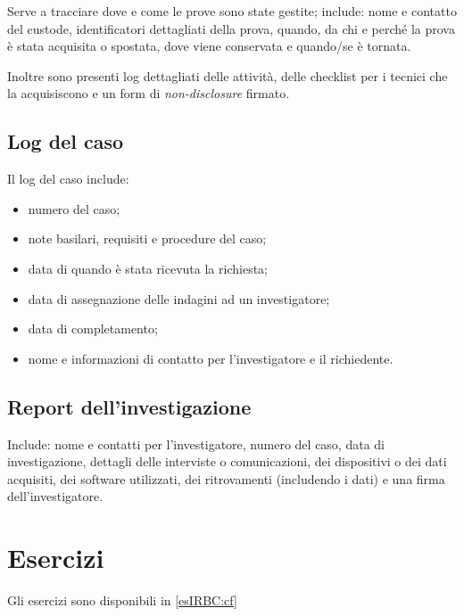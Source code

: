 Serve a tracciare dove e come le prove sono state gestite; include:
nome e contatto del custode, identificatori dettagliati della prova, quando,
da chi e perché la prova è stata acquisita o spostata, dove viene conservata
e quando/se è tornata.

Inoltre sono presenti log dettagliati delle attività, delle checklist per i
tecnici che la acquisiscono e un form di \textit{non-disclosure} firmato.

\subsection{Log del caso}

Il log del caso include:
\begin{itemize}
\item numero del caso;
\item note basilari, requisiti e procedure del caso;
\item data di quando è stata ricevuta la richiesta;
\item data di assegnazione delle indagini ad un investigatore;
\item data di completamento;
\item nome e informazioni di contatto per l'investigatore e il richiedente.
\end{itemize}

\subsection{Report dell'investigazione}

Include: nome e contatti per l'investigatore, numero del caso, data di
investigazione, dettagli delle interviste o comunicazioni, dei
dispositivi o dei dati acquisiti, dei software utilizzati, dei ritrovamenti
(includendo i dati) e una firma dell'investigatore.

\section{Esercizi}

Gli esercizi sono disponibili in \ref{esIRBC:cf}

